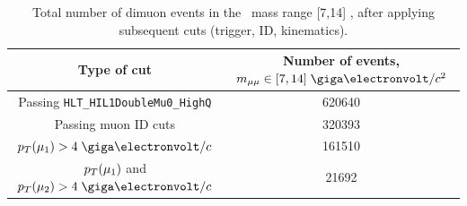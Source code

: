 \begin{table}[h]
  \begin{center}
    \begin{tabular}{|c|c|}
\hline
     Type of cut & Number of events, $m_{\mu\mu} \in [7,14] \; \unitMass$ \\
      \hline
      \hline
      Passing \verb?HLT_HIL1DoubleMu0_HighQ?& 620640\\
      Passing muon ID cuts& 320393 \\ 
      $\pt(\mu_{1}) > 4 \; \GeVc $ & 161510\\  
      $p_{T}(\mu_{1})$ and $\pt(\mu_{2}) > 4 \; \GeVc$  & 21692\\
      \hline
    \end{tabular}
  \end{center}
  \caption{Total number of dimuon events in the \PgU\ mass range
    [7,14] \; \unitMass, after applying subsequent cuts (trigger, ID, kinematics).}
\label{tab:totalNevts}
\end{table}

